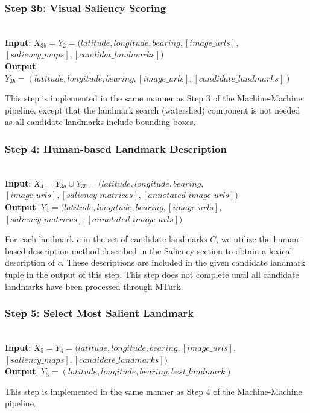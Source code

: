 \subsubsection*{Step 3b: Visual Saliency Scoring}~\\
\noindent\textbf{Input}: $X_{3b} = Y_2 = (latitude, longitude, bearing,  [image\_urls], $\\$[saliency\_maps], [candidat\_landmarks] )$\\
\textbf{Output}: $Y_{3b} = (latitude, longitude, bearing,  [image\_urls], [candidate\_landmarks] )$ 

This step is implemented in the same manner as Step 3 of the Machine-Machine pipeline, except that the landmark search (watershed) component is not needed as all candidate landmarks include bounding boxes.

\subsubsection*{Step 4: Human-based Landmark Description}~\\
\noindent\textbf{Input}: $X_4 = Y_{3a} \cup Y_{3b} = (latitude, longitude, bearing, $\\$[image\_urls], [saliency\_matrices], [annotated\_image\_urls])$ \\
\textbf{Output}: $Y_4 = (latitude, longitude, bearing, [image\_urls],$\\$ [saliency\_matrices], [annotated\_image\_urls])$ 

For each landmark $c$ in the set of candidate landmarks $C$, we utilize the human-based description method described in the Saliency section to obtain a lexical description of $c$. These descriptions are included in the given candidate landmark tuple in the output of this step. This step does not complete until all candidate landmarks have been processed through MTurk.

\subsubsection*{Step 5: Select Most Salient Landmark}~\\
\noindent\textbf{Input}: $X_5 = Y_4 = (latitude, longitude, bearing,  [image\_urls], $\\$[saliency\_maps], [candidate\_landmarks] )$\\
\textbf{Output}: $Y_5 = (latitude, longitude, bearing, best\_landmark)$
 
This step is implemented in the same manner as Step 4 of the Machine-Machine pipeline.

